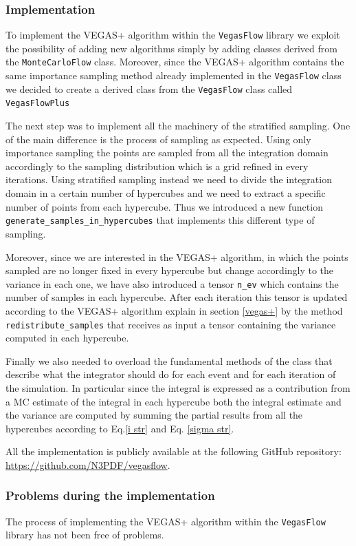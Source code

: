 \documentclass[../main/main.tex]{subfiles}
\begin{document}
\subsubsection{Implementation}
To implement the VEGAS+ algorithm within the \texttt{VegasFlow} library we exploit the possibility of adding new algorithms simply by
adding classes derived from the \texttt{MonteCarloFlow} class. Moreover, since the VEGAS+ algorithm contains the same importance sampling method already implemented in the \texttt{VegasFlow} class we decided to create a derived class from the \texttt{VegasFlow} class called \texttt{VegasFlowPlus}

The next step was to implement all the machinery of the stratified sampling. 
One of the main difference is the process of sampling as expected. Using only importance sampling the points are sampled from all the integration domain accordingly to the sampling distribution which is a grid refined in every iterations. Using stratified sampling instead we need to divide the integration domain in a certain number of hypercubes and we need to extract a specific number of points from each hypercube. 
Thus we introduced a new function \texttt{generate\_samples\_in\_hypercubes} that implements this different type of sampling.

Moreover, since we are interested in the VEGAS+ algorithm, in which the points sampled are no longer fixed in every hypercube but change accordingly to the variance in each one, we have also introduced a tensor \texttt{n\_ev} which contains the number of samples in each hypercube. 
After each iteration this tensor is updated according to the VEGAS+ algorithm explain in section \ref{vegas+} by the method \texttt{redistribute\_samples} that receives as input a tensor containing the variance computed in each hypercube.

Finally we also needed to overload the fundamental methods of the class that describe what the integrator should do for each event and for each iteration of the simulation. In particular since the integral is expressed as a contribution from a MC estimate of the integral in each hypercube both the integral estimate and the variance are computed by summing the partial results from all the hypercubes according to Eq.\eqref{i str} and Eq. \eqref{sigma str}.

All the implementation is publicly available at the following GitHub repository: \url{https://github.com/N3PDF/vegasflow}.
\subsubsection{Problems during the implementation}
The process of implementing the VEGAS+ algorithm within the \texttt{VegasFlow} library has not been free of problems.
\end{document}
